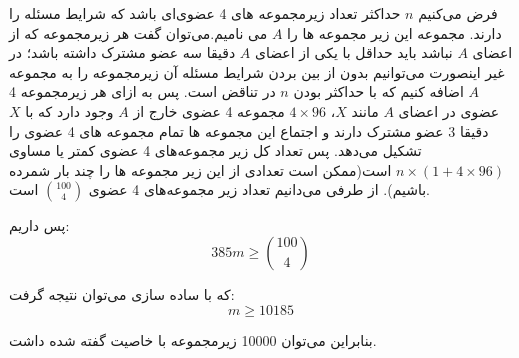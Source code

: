 \p
فرض می‌کنیم $n$ حداکثر تعداد زیرمجموعه های 4 عضوی‌ای باشد که شرایط مسئله را دارند. مجموعه این زیر مجموعه ها را $A$ می نامیم.می‌توان گفت هر زیرمجموعه که از اعضای $A$ نباشد باید حداقل با یکی از اعضای $A$ دقیقا سه عضو مشترک داشته باشد؛ در غیر اینصورت می‌توانیم بدون از بین بردن شرایط مسئله آن زیرمجموعه را به مجموعه $A$ اضافه کنیم که با حداکثر بودن $n$ در تناقض است. پس به ازای هر زیرمجموعه 4 عضوی در اعضای $A$ مانند $X$، $4 \times 96$ مجموعه 4 عضوی خارج از $A$ وجود دارد که با $X$ دقیقا 3 عضو مشترک دارند و اجتماع این مجموعه ها تمام مجموعه های 4 عضوی را تشکیل می‌دهد. پس تعداد کل زیر مجموعه‌های 4 عضوی کمتر یا مساوی $n \times (1 + 4 \times 96)$ است(ممکن است تعدادی از این زیر مجموعه ها را چند بار شمرده باشیم). از طرفی می‌دانیم تعداد زیر مجموعه‌های 4 عضوی $ 100 \choose 4 $ است.

	پس داریم:
	$$ 385m \ge { 100 \choose 4} $$

	که با ساده سازی می‌توان نتیجه گرفت:
    $$m \ge 10185$$
    
    بنابراین می‌توان 10000 زیرمجموعه با خاصیت گفته شده داشت.
